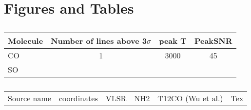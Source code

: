 \section{Figures and Tables}
\begin{table}
\caption{}
\begin{tabular}{ l c c c }
Molecule & Number of lines above 3$\sigma$ & peak T & PeakSNR\\
\hline
CO       & 1               & 3000   & 45      \\
SO       
\hline
\end{tabular}
\end{table}


\begin{table}
\caption{}
\begin{tabular}{ l c c c c c}
Source name & coordinates & VLSR & NH2 & T12CO (Wu et al.)& Tex \\
\end{tabular}
\end{table}
 
  
  
  
  
  
  
  
  
  
  
  
  
  
  
  
  
  
  
  
  
  
  
  